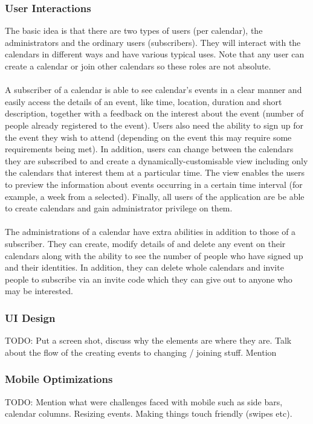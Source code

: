 \documentclass[10pt,a4paper]{article}
\begin{document}
\subsubsection{User Interactions}
The basic idea is that there are two types of users (per calendar), the administrators and the ordinary users (subscribers). They will interact with the calendars in diﬀerent ways and have various typical uses. Note that any user can create a calendar or join other calendars so these roles are not absolute.
\\
\\
\noindent
A subscriber of a calendar is able to see calendar’s events in a clear manner and easily access the details of an event, like time, location, duration and short description, together with a feedback on the interest about the event (number of people already registered to the event). Users also need the ability to sign up for the event they wish to attend (depending on the event this may require some requirements being met). In addition, users can change between the calendars they are subscribed to and create a dynamically-customisable view including only the calendars that interest them at a particular time. The view enables the users to preview the information about events occurring in a certain time interval (for example, a week from a selected). Finally, all users of the application are be able to create calendars and gain administrator privilege on them.
\\
\\
\noindent
The administrations of a calendar have extra abilities in addition to those of a subscriber. They can create, modify details of and delete any event on their calendars along with the ability to see the number of people who have signed up and their identities. In addition, they can delete whole calendars and invite people to subscribe via an invite code which they can give out to anyone who may be interested.

\subsubsection{UI Design}
TODO: Put a screen shot, discuss why the elements are where they are. Talk about the flow of the creating events to changing / joining stuff. Mention

\subsubsection{Mobile Optimizations}
TODO: Mention what were challenges faced with mobile such as side bars, calendar columns. Resizing events. Making things touch friendly (swipes etc).
\end{document}
